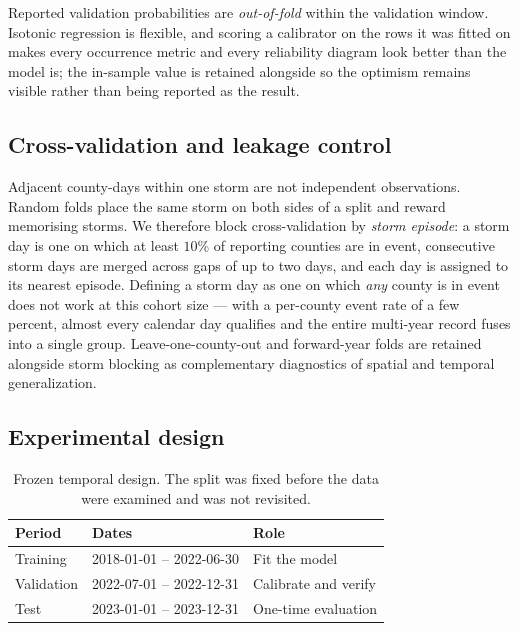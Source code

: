 \documentclass[10pt,twocolumn,letterpaper]{article}
\begin{document}
Reported validation probabilities are \emph{out-of-fold} within the validation
window. Isotonic regression is flexible, and scoring a calibrator on the rows it
was fitted on makes every occurrence metric and every reliability diagram look
better than the model is; the in-sample value is retained alongside so the
optimism remains visible rather than being reported as the result.

\subsection{Cross-validation and leakage control}

Adjacent county-days within one storm are not independent observations. Random
folds place the same storm on both sides of a split and reward memorising
storms. We therefore block cross-validation by \emph{storm episode}: a storm day
is one on which at least $10\%$ of reporting counties are in event, consecutive
storm days are merged across gaps of up to two days, and each day is assigned to
its nearest episode. Defining a storm day as one on which \emph{any} county is
in event does not work at this cohort size --- with a per-county event rate of a
few percent, almost every calendar day qualifies and the entire multi-year
record fuses into a single group. Leave-one-county-out and forward-year folds
are retained alongside storm blocking as complementary diagnostics of spatial
and temporal generalization.

\subsection{Experimental design}

\begin{table}[!t]
\centering
\caption{Frozen temporal design. The split was fixed before the data were
examined and was not revisited.}
\label{tab:design}
\small
\begin{tabular}{@{}lll@{}}
\toprule
\textbf{Period} & \textbf{Dates} & \textbf{Role} \\
\midrule
Training    & 2018-01-01 -- 2022-06-30 & Fit the model \\
Validation  & 2022-07-01 -- 2022-12-31 & Calibrate and verify \\
Test        & 2023-01-01 -- 2023-12-31 & One-time evaluation \\
\bottomrule
\end{tabular}
\end{table}
\end{document}
